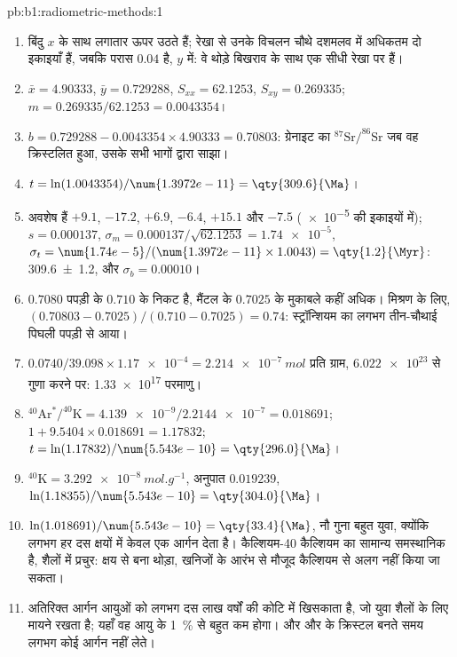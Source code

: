 \begin{solution}{pb:b1:radiometric-methods:1}
\begin{enumerate}
  \item बिंदु $x$ के साथ लगातार ऊपर उठते हैं; रेखा से उनके विचलन चौथे दशमलव में अधिकतम दो इकाइयाँ हैं, जबकि परास $0.04$ है, $y$ में: वे थोड़े बिखराव के साथ एक सीधी रेखा पर हैं।
  \item $\bar x = 4.90333$, $\bar y = 0.729288$, $S_{xx} = 62.1253$, $S_{xy} =
        0.269335$; $m = 0.269335/62.1253 = 0.0043354$।
  \item $b = 0.729288 - 0.0043354 \times 4.90333 = 0.70803$: ग्रेनाइट का $^{87}\mathrm{Sr}/^{86}\mathrm{Sr}$ जब वह क्रिस्टलित हुआ, उसके सभी भागों द्वारा साझा।
  \item $t = \ln(1.0043354)/\num{1.3972e-11} = \qty{309.6}{\Ma}$।
  \item अवशेष हैं $+9.1$, $-17.2$, $+6.9$, $-6.4$, $+15.1$ और $-7.5$ (\num{e-5} की इकाइयों में); $s = 0.000137$, $\sigma_m = 0.000137/\sqrt{62.1253} =
        \num{1.74e-5}$, $\sigma_t = \num{1.74e-5}/(\num{1.3972e-11} \times 1.0043)
        = \qty{1.2}{\Myr}$: \qty[uncertainty-mode=separate]{309.6(12)}{\Ma}, और $\sigma_b = 0.00010$।
  \item $0.7080$ पपड़ी के $0.710$ के निकट है, मैंटल के $0.7025$ के मुकाबले कहीं अधिक। मिश्रण के लिए, $(0.70803 - 0.7025)/(0.710 - 0.7025) = 0.74$: स्ट्रॉन्शियम का लगभग तीन-चौथाई पिघली पपड़ी से आया।
  \item $0.0740/39.098 \times \num{1.17e-4} = \qty{2.214e-7}{mol}$ प्रति ग्राम, $\num{6.022e23}$ से गुणा करने पर: \num{1.33e17} परमाणु।
  \item $^{40}\mathrm{Ar}^*/^{40}\mathrm{K} = \num{4.139e-9}/\num{2.2144e-7} =
        0.018691$; $1 + 9.5404 \times 0.018691 = 1.17832$; $t =
        \ln(1.17832)/\num{5.543e-10} = \qty{296.0}{\Ma}$।
  \item $^{40}\mathrm{K} = \qty{3.292e-8}{mol.g^{-1}}$, अनुपात $0.019239$, $\ln(1.18355)/\num{5.543e-10} = \qty{304.0}{\Ma}$।
  \item $\ln(1.018691)/\num{5.543e-10} = \qty{33.4}{\Ma}$, नौ गुना बहुत युवा, क्योंकि लगभग हर दस क्षयों में केवल एक आर्गन देता है। कैल्शियम-40 कैल्शियम का सामान्य समस्थानिक है, शैलों में प्रचुर: क्षय से बना थोड़ा, खनिजों के आरंभ से मौजूद कैल्शियम से अलग नहीं किया जा सकता।
  \item अतिरिक्त आर्गन आयुओं को लगभग दस लाख वर्षों की कोटि में खिसकाता है, जो युवा शैलों के लिए मायने रखता है; यहाँ वह आयु के \qty{1}{\percent} से बहुत कम होगा। और  और  के क्रिस्टल बनते समय लगभग कोई आर्गन नहीं लेते।

\end{enumerate}
\end{solution}
